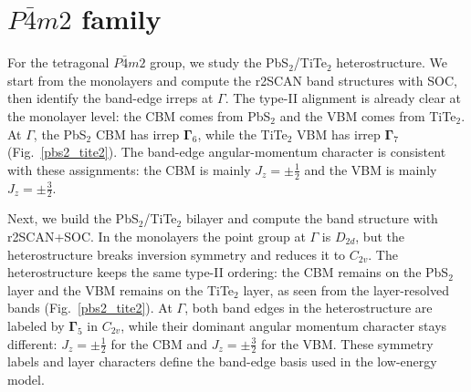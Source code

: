\documentclass[aps, preprint, prb,]{revtex4-2}
\begin{document}
\section{ $P\bar{4}m2$ family}
For the tetragonal $P\bar{4}m2$ group, we study the PbS$_2$/TiTe$_2$ heterostructure. We start from the monolayers and compute the r2SCAN band structures with SOC, then identify the band-edge irreps at $\Gamma$. The type-II alignment is already clear at the monolayer level: the CBM comes from PbS$_2$ and the VBM comes from TiTe$_2$. At $\Gamma$, the PbS$_2$ CBM has irrep $\mathbf{\Gamma}_6$, while the TiTe$_2$ VBM has irrep $\mathbf{\Gamma}_7$ (Fig.~\ref{pbs2_tite2}). The band-edge angular-momentum character is consistent with these assignments: the CBM is mainly $J_z=\pm \tfrac{1}{2}$ and the VBM is mainly $J_z=\pm \tfrac{3}{2}$.

Next, we build the PbS$_2$/TiTe$_2$ bilayer and compute the band structure with r2SCAN+SOC. In the monolayers the point group at $\Gamma$ is $D_{2d}$, but the heterostructure breaks inversion symmetry and reduces it to $C_{2v}$. The heterostructure keeps the same type-II ordering: the CBM remains on the PbS$_2$ layer and the VBM remains on the TiTe$_2$ layer, as seen from the layer-resolved bands (Fig.~\ref{pbs2_tite2}). At $\Gamma$, both band edges in the heterostructure are labeled by $\mathbf{\Gamma}_5$ in $C_{2v}$, while their dominant angular momentum character stays different: $J_z=\pm \tfrac{1}{2}$ for the CBM and $J_z=\pm \tfrac{3}{2}$ for the VBM. These symmetry labels and layer characters define the band-edge basis used in the low-energy model.

\begin{table}[htbp]
\centering
\caption{Candidate material pairs for type-II heterostructures in $P\bar{4}m2$ space group including their lattice constants, band edges (CBM/VBM) with irreducible representations (IRs), type-II energy gap, and lattice mismatch.}
\renewcommand{\arraystretch}{1.2}
\setlength{\tabcolsep}{4pt}
\label{tab:p-4m2}
\end{table}
\end{document}
